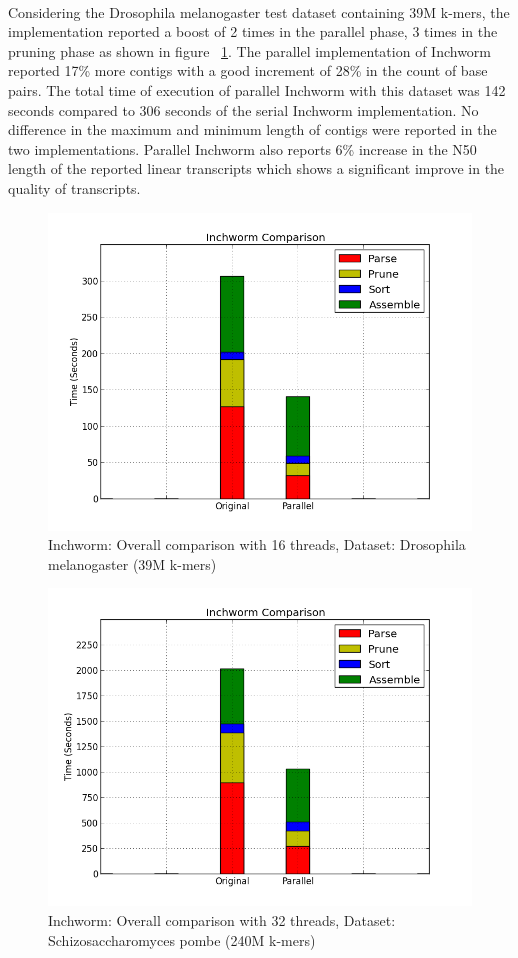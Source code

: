 \label{key}\documentclass[plainarticle, english ,zihtitle,final,hyperref,utf8]{zihpub}
\begin{document}
\paragraph{}
Considering the Drosophila melanogaster test dataset containing 39M k-mers, the implementation reported a boost of 2 times in the parallel phase, 3 times in the pruning phase as shown in figure ~\ref{drozo}. The parallel implementation of Inchworm reported 17\% more contigs with a good increment of 28\% in the count of base pairs. The total time of execution of parallel Inchworm with this dataset was 142 seconds compared to 306 seconds of the serial Inchworm implementation. No difference in the maximum and minimum length of contigs were reported in the two implementations. Parallel Inchworm also reports 6\% increase in the N50 length of the reported linear transcripts which shows a significant improve in the quality of transcripts. 
\begin{figure}[h]
\center
\includegraphics[scale=0.45]{inch_compare}
\caption{Inchworm: Overall comparison with 16 threads, Dataset: Drosophila melanogaster (39M k-mers)}
\label{drozo}
\end{figure}
\begin{figure}[h]
\center
\includegraphics[scale=0.45]{compare-Inchworm-schizo}
\caption{Inchworm: Overall comparison with 32 threads, Dataset: Schizosaccharomyces pombe (240M k-mers)}
\label{schizo}
\end{figure}
\end{document}
